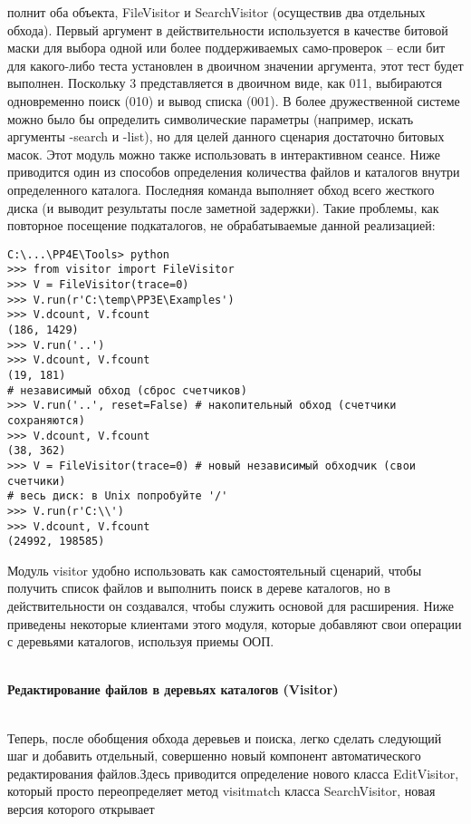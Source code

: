 \documentclass[12pt]{article}
\begin{document}
полнит оба объекта, FileVisitor и SearchVisitor (осуществив два отдельных обхода). Первый аргумент в действительности используется в качестве битовой маски для выбора одной или более поддерживаемых само-проверок – если бит для какого-либо теста установлен в двоичном значении аргумента, этот тест будет выполнен. Поскольку 3 представляется
в двоичном виде, как 011, выбираются одновременно поиск (010) и вывод
списка (001). В более дружественной сис­теме можно было бы определить
символические параметры (например, искать аргументы -search и -list),
но для целей данного сценария достаточно битовых масок.
Этот модуль можно также использовать в интерактивном
сеансе. Ниже приводится один из способов определения количества
файлов и каталогов внутри определенного каталога. Последняя команда выполняет обход всего жесткого диска (и выводит результаты после
заметной задержки). Такие проблемы, как повторное посещение подкаталогов, не обрабатываемые данной реализацией:
\begin{verbatim}
C:\...\PP4E\Tools> python
>>> from visitor import FileVisitor
>>> V = FileVisitor(trace=0)
>>> V.run(r'C:\temp\PP3E\Examples')
>>> V.dcount, V.fcount
(186, 1429)
>>> V.run('..')
>>> V.dcount, V.fcount
(19, 181)
# независимый обход (сброс счетчиков)
>>> V.run('..', reset=False) # накопительный обход (счетчики сохраняются)
>>> V.dcount, V.fcount
(38, 362)
>>> V = FileVisitor(trace=0) # новый независимый обходчик (свои счетчики)
# весь диск: в Unix попробуйте '/'
>>> V.run(r'C:\\')
>>> V.dcount, V.fcount
(24992, 198585)
\end{verbatim}
Модуль visitor удобно использовать как самостоятельный сценарий,
чтобы получить список файлов и выполнить поиск в дереве каталогов,
но в действительности он создавался, чтобы служить основой для расширения. Ниже приведены
некоторые клиентами этого модуля, которые добавляют свои операции с деревьями каталогов, используя приемы ООП.\\ \\
\begin{large}
\textbf{Редактирование файлов в деревьях каталогов (Visitor)} \\ \\
\end{large}
Теперь, после обобщения обхода деревьев и поиска, легко сделать следующий шаг и добавить отдельный, совершенно новый компонент автоматического редактирования файлов.Здесь приводится
определение нового класса EditVisitor, который просто переопределяет
метод visitmatch класса SearchVisitor, новая версия которого открывает
\end{document}
